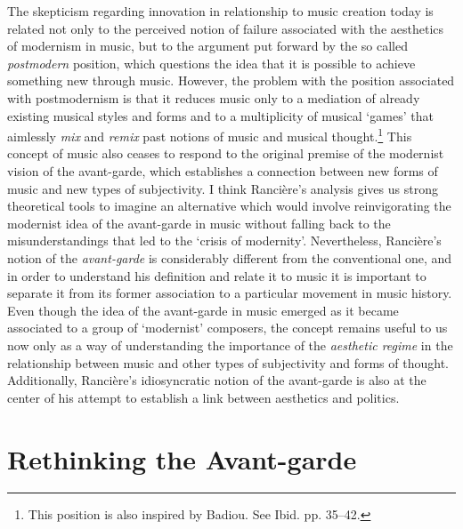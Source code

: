 The skepticism regarding innovation in relationship to music creation today is related not only to the perceived notion of failure associated with the aesthetics of modernism in music, but to the argument put forward by the so called \emph{postmodern} position, which questions the idea that it is possible to achieve something new through music. However, the problem with the position associated with postmodernism is that it reduces music only to a mediation of already existing musical styles and forms and to a multiplicity of musical `games' that aimlessly \emph{mix} and \emph{remix} past notions of music and musical thought.\footnote{This position is also inspired by Badiou. See Ibid. pp. 35--42.} This concept of music also ceases to respond to the original premise of the modernist vision of the avant-garde, which establishes a connection between new forms of music and new types of subjectivity. I think Ranci\`{e}re's analysis gives us strong theoretical tools to imagine an alternative which would involve reinvigorating the modernist idea of the avant-garde in music without falling back to the misunderstandings that led to the `crisis of modernity'. Nevertheless, Ranci\`{e}re's notion of the \emph{avant-garde} is considerably different from the conventional one, and in order to understand his definition and relate it to music it is important to separate it from its former association to a particular movement in music history. Even though the idea of the avant-garde in music emerged as it became associated to a group of `modernist' composers, the concept remains useful to us now only as a way of understanding the importance of the \emph{aesthetic regime} in the relationship between music and other types of subjectivity and forms of thought. Additionally, Ranci\`{e}re's idiosyncratic notion of the avant-garde is also at the center of his attempt to establish a link between aesthetics and politics. 

\hypertarget{rethinkavant}{}
\section{Rethinking the Avant-garde}

